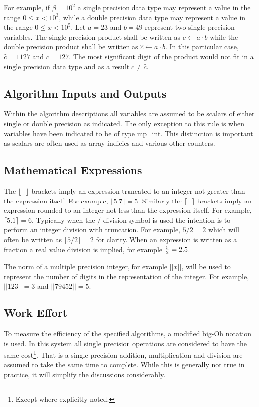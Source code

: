 \documentclass[b5paper]{book}
\begin{document}
For example, if $\beta = 10^2$ a single precision data type may represent a value in the 
range $0 \le x < 10^3$, while a double precision data type may represent a value in the range $0 \le x < 10^5$.  Let
$a = 23$ and $b = 49$ represent two single precision variables.  The single precision product shall be written
as $c \leftarrow a \cdot b$ while the double precision product shall be written as $\hat c \leftarrow a \cdot b$.
In this particular case, $\hat c = 1127$ and $c = 127$.  The most significant digit of the product would not fit 
in a single precision data type and as a result $c \ne \hat c$.  

\subsection{Algorithm Inputs and Outputs}
Within the algorithm descriptions all variables are assumed to be scalars of either single or double precision
as indicated.  The only exception to this rule is when variables have been indicated to be of type mp\_int.  This 
distinction is important as scalars are often used as array indicies and various other counters.  

\subsection{Mathematical Expressions}
The $\lfloor \mbox{ } \rfloor$ brackets imply an expression truncated to an integer not greater than the expression 
itself.  For example, $\lfloor 5.7 \rfloor = 5$.  Similarly the $\lceil \mbox{ } \rceil$ brackets imply an expression
rounded to an integer not less than the expression itself.  For example, $\lceil 5.1 \rceil = 6$.  Typically when 
the $/$ division symbol is used the intention is to perform an integer division with truncation.  For example, 
$5/2 = 2$ which will often be written as $\lfloor 5/2 \rfloor = 2$ for clarity.  When an expression is written as a 
fraction a real value division is implied, for example ${5 \over 2} = 2.5$.  

The norm of a multiple precision integer, for example $\vert \vert x \vert \vert$, will be used to represent the number of digits in the representation
of the integer.  For example, $\vert \vert 123 \vert \vert = 3$ and $\vert \vert 79452 \vert \vert = 5$.  

\subsection{Work Effort}
To measure the efficiency of the specified algorithms, a modified big-Oh notation is used.  In this system all 
single precision operations are considered to have the same cost\footnote{Except where explicitly noted.}.  
That is a single precision addition, multiplication and division are assumed to take the same time to 
complete.  While this is generally not true in practice, it will simplify the discussions considerably.
\end{document}
